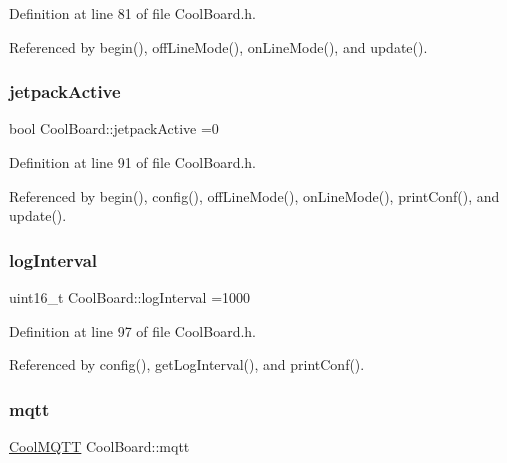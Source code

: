 Definition at line 81 of file Cool\+Board.\+h.



Referenced by begin(), off\+Line\+Mode(), on\+Line\+Mode(), and update().

\mbox{\label{classCoolBoard_a9be03a913d26e558328935ca3b59a75e}} 
\subsubsection{\texorpdfstring{jetpack\+Active}{jetpackActive}}
{\footnotesize\ttfamily bool Cool\+Board\+::jetpack\+Active =0\hspace{0.3cm}{\ttfamily [private]}}



Definition at line 91 of file Cool\+Board.\+h.



Referenced by begin(), config(), off\+Line\+Mode(), on\+Line\+Mode(), print\+Conf(), and update().

\mbox{\label{classCoolBoard_a4de0096d575d66b472c4c1f0111fd452}} 
\subsubsection{\texorpdfstring{log\+Interval}{logInterval}}
{\footnotesize\ttfamily uint16\+\_\+t Cool\+Board\+::log\+Interval =1000\hspace{0.3cm}{\ttfamily [private]}}



Definition at line 97 of file Cool\+Board.\+h.



Referenced by config(), get\+Log\+Interval(), and print\+Conf().

\mbox{\label{classCoolBoard_a2399f44d7c23c1149a335cb3b46d90f1}} 
\subsubsection{\texorpdfstring{mqtt}{mqtt}}
{\footnotesize\ttfamily \hyperlink{classCoolMQTT}{Cool\+M\+Q\+TT} Cool\+Board\+::mqtt\hspace{0.3cm}{\ttfamily [private]}}



